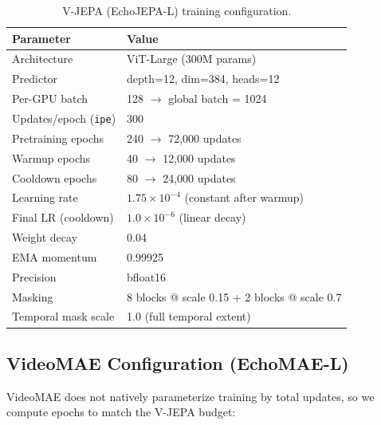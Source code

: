 \documentclass{article}
\theoremstyle{plain}
\theoremstyle{definition}
\theoremstyle{remark}
\begin{document}
\begin{table}[h]
\centering
\small
\begin{tabular}{ll}
\toprule
\textbf{Parameter} & \textbf{Value} \\
\midrule
Architecture & ViT-Large (300M params) \\
Predictor & depth=12, dim=384, heads=12 \\
Per-GPU batch & 128 $\rightarrow$ global batch = 1024 \\
Updates/epoch (\texttt{ipe}) & 300 \\
Pretraining epochs & 240 $\rightarrow$ 72,000 updates \\
Warmup epochs & 40 $\rightarrow$ 12,000 updates \\
Cooldown epochs & 80 $\rightarrow$ 24,000 updates \\
\midrule
Learning rate & $1.75 \times 10^{-4}$ (constant after warmup) \\
Final LR (cooldown) & $1.0 \times 10^{-6}$ (linear decay) \\
Weight decay & 0.04 \\
EMA momentum & 0.99925 \\
Precision & bfloat16 \\
\midrule
Masking & 8 blocks @ scale 0.15 + 2 blocks @ scale 0.7 \\
Temporal mask scale & 1.0 (full temporal extent) \\
\bottomrule
\end{tabular}
\caption{V-JEPA (EchoJEPA-L) training configuration.}
\label{tab:vjepa-config}
\end{table}

\subsection{VideoMAE Configuration (EchoMAE-L)}

VideoMAE does not natively parameterize training by total updates, so we compute epochs to match the V-JEPA budget:
\end{document}
